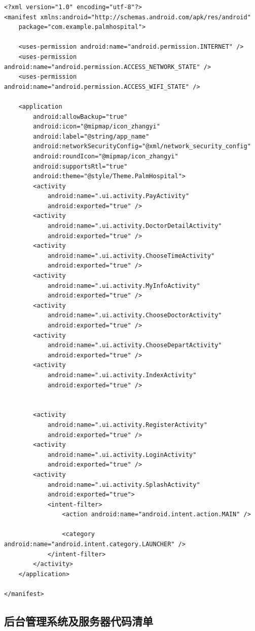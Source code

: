 \documentclass[UTF8,12pt]{article}
\begin{document}
\begin{lstlisting}[frame=shadowbox]
    <?xml version="1.0" encoding="utf-8"?>
<manifest xmlns:android="http://schemas.android.com/apk/res/android"
    package="com.example.palmhospital">

    <uses-permission android:name="android.permission.INTERNET" />
    <uses-permission android:name="android.permission.ACCESS_NETWORK_STATE" />
    <uses-permission android:name="android.permission.ACCESS_WIFI_STATE" />

    <application
        android:allowBackup="true"
        android:icon="@mipmap/icon_zhangyi"
        android:label="@string/app_name"
        android:networkSecurityConfig="@xml/network_security_config"
        android:roundIcon="@mipmap/icon_zhangyi"
        android:supportsRtl="true"
        android:theme="@style/Theme.PalmHospital">
        <activity
            android:name=".ui.activity.PayActivity"
            android:exported="true" />
        <activity
            android:name=".ui.activity.DoctorDetailActivity"
            android:exported="true" />
        <activity
            android:name=".ui.activity.ChooseTimeActivity"
            android:exported="true" />
        <activity
            android:name=".ui.activity.MyInfoActivity"
            android:exported="true" />
        <activity
            android:name=".ui.activity.ChooseDoctorActivity"
            android:exported="true" />
        <activity
            android:name=".ui.activity.ChooseDepartActivity"
            android:exported="true" />
        <activity
            android:name=".ui.activity.IndexActivity"
            android:exported="true" />


        <activity
            android:name=".ui.activity.RegisterActivity"
            android:exported="true" />
        <activity
            android:name=".ui.activity.LoginActivity"
            android:exported="true" />
        <activity
            android:name=".ui.activity.SplashActivity"
            android:exported="true">
            <intent-filter>
                <action android:name="android.intent.action.MAIN" />

                <category android:name="android.intent.category.LAUNCHER" />
            </intent-filter>
        </activity>
    </application>

</manifest>
\end{lstlisting}

\subsection{后台管理系统及服务器代码清单}
\end{document}
